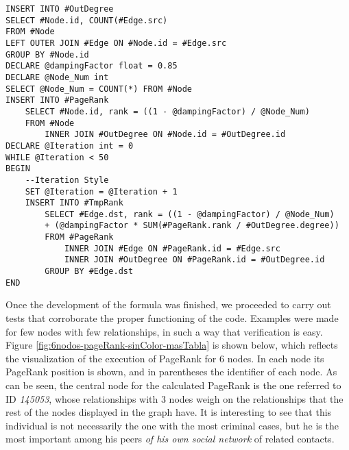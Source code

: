 \begin{multicols}{2}
\tiny{
\begin{verbatim}
INSERT INTO #OutDegree
SELECT #Node.id, COUNT(#Edge.src)
FROM #Node 
LEFT OUTER JOIN #Edge ON #Node.id = #Edge.src
GROUP BY #Node.id
DECLARE @dampingFactor float = 0.85
DECLARE @Node_Num int
SELECT @Node_Num = COUNT(*) FROM #Node
INSERT INTO #PageRank
	SELECT #Node.id, rank = ((1 - @dampingFactor) / @Node_Num)
	FROM #Node 
		INNER JOIN #OutDegree ON #Node.id = #OutDegree.id
DECLARE @Iteration int = 0
WHILE @Iteration < 50
BEGIN
	--Iteration Style
	SET @Iteration = @Iteration + 1
	INSERT INTO #TmpRank
		SELECT #Edge.dst, rank = ((1 - @dampingFactor) / @Node_Num) 
		+ (@dampingFactor * SUM(#PageRank.rank / #OutDegree.degree))
		FROM #PageRank 
			INNER JOIN #Edge ON #PageRank.id = #Edge.src
			INNER JOIN #OutDegree ON #PageRank.id = #OutDegree.id
		GROUP BY #Edge.dst
END
\end{verbatim}
}
\end{multicols}
Once the development of the formula was finished, we proceeded to carry out tests that corroborate the proper functioning of the code. Examples were made for few nodes with few relationships, in such a way that verification is easy. Figure \ref{fig:6nodos-pageRank-sinColor-masTabla} is shown below, which reflects the visualization of the execution of PageRank for 6 nodes. In each node its PageRank position is shown, and in parentheses the identifier of each node. As can be seen, the central node for the calculated PageRank is the one referred to ID \textit{145053}, whose relationships with 3 nodes weigh on the relationships that the rest of the nodes displayed in the graph have.
It is interesting to see that this individual is not necessarily the one with the most criminal cases, but he is the most important among his peers \textit{of his own social network} of related contacts.


